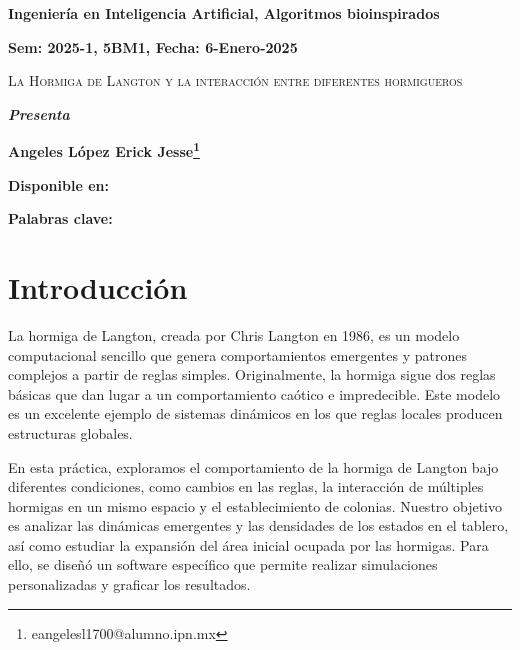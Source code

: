 \documentclass[12pt,twoside]{article}
\newcommand{\keywords}[1]{%
	\begin{center}
		\textbf{Palabras clave:} #1
	\end{center}
}
\begin{document}
	
	\centerline{\bf Ingeniería en Inteligencia Artificial, Algoritmos bioinspirados}
	
	\centerline{\bf  Sem: 2025-1, 5BM1, Fecha: 6-Enero-2025}
	
	\centerline{}
	
	
	
	\begin{center}
		\Large{\textsc{La Hormiga de Langton y la interacción entre diferentes hormigueros}} 
	\end{center}
	\centerline{}
	\centerline{\bf {\textit{Presenta}}}
	\centerline{\bf {Angeles López Erick Jesse\footnote{eangelesl1700@alumno.ipn.mx}}}
	\centerline{}
	\centerline{}
	\centerline{\bf {Disponible en:}}
	\centerline{}
	
	
	
	
	\newtheorem{Theorem}{\quad Theorem}[section]
	
	\newtheorem{Definition}[Theorem]{\quad Definition}
	
	\newtheorem{Corollary}[Theorem]{\quad Corollary}
	
	\newtheorem{Lemma}[Theorem]{\quad Lemma}
	
	\newtheorem{Example}[Theorem]{\quad Example}
	
	\bigskip
	
	\bigskip
	
	\begin{abstract} 
		
	\end{abstract}
	
	\keywords{}
	
	\clearpage
	
	\tableofcontents
	\clearpage
	
	\clearpage
	\section{Introducción}
	
	La hormiga de Langton, creada por Chris Langton en 1986, es un modelo computacional sencillo que genera comportamientos emergentes y patrones complejos a partir de reglas simples. Originalmente, la hormiga sigue dos reglas básicas que dan lugar a un comportamiento caótico e impredecible. Este modelo es un excelente ejemplo de sistemas dinámicos en los que reglas locales producen estructuras globales.
	
	En esta práctica, exploramos el comportamiento de la hormiga de Langton bajo diferentes condiciones, como cambios en las reglas, la interacción de múltiples hormigas en un mismo espacio y el establecimiento de colonias. Nuestro objetivo es analizar las dinámicas emergentes y las densidades de los estados en el tablero, así como estudiar la expansión del área inicial ocupada por las hormigas. Para ello, se diseñó un software específico que permite realizar simulaciones personalizadas y graficar los resultados.
	
\end{document}
